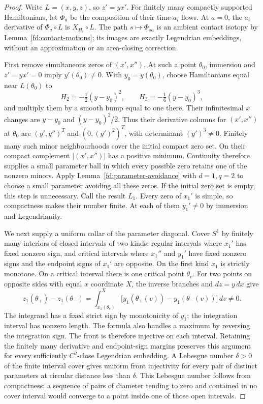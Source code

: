 \begin{proof}
Write $L=(x,y,z)$, so $z'=yx'$. For finitely many compactly supported
Hamiltonians, let $\Phi_a$ be the composition of their time-$a_i$ flows.
At $a=0$, the $a_i$ derivative of $\Phi_a\circ L$ is $X_{H_i}\circ L$.
The path $s\mapsto\Phi_{sa}$ is an ambient contact isotopy by
Lemma~\ref{fd:contact-motions}; its images are exactly Legendrian
embeddings, without an approximation or an area-closing correction.

First remove simultaneous zeros of $(x',x'')$. At such a point
$\theta_0$, immersion and $z'=yx'=0$ imply $y'(\theta_0)\ne0$.
With $y_0=y(\theta_0)$, choose Hamiltonians equal near $L(\theta_0)$ to
\begin{equation}
 H_2=-\tfrac12(y-y_0)^2,\qquad H_3=-\tfrac16(y-y_0)^3,
\end{equation}
and multiply them by a smooth bump equal to one there. Their
infinitesimal $x$ changes are $y-y_0$ and $(y-y_0)^2/2$.
Thus their derivative columns for $(x',x'')$ at $\theta_0$ are
$(y',y'')^T$ and $(0,(y')^2)^T$, with determinant $(y')^3\ne0$.
Finitely many such minor neighbourhoods cover the initial compact zero
set. On their compact complement $|(x',x'')|$ has a positive minimum.
Continuity therefore supplies a small parameter ball in which every
possible zero retains one of the nonzero minors. Apply
Lemma~\ref{fd:parameter-avoidance} with $d=1,q=2$ to choose a small
parameter avoiding all these zeros. If the initial zero set is empty,
this step is unnecessary. Call the result $L_1$.
Every zero of $x_1'$ is simple, so compactness makes their number finite.
At each of them $y_1'\ne0$ by immersion and Legendrianity.

We next supply a uniform collar of the parameter diagonal. Cover $S^1$
by finitely many interiors of closed intervals of two kinds: regular
intervals where $x_1'$ has fixed nonzero sign, and critical intervals
where $x_1''$ and $y_1'$ have fixed nonzero signs and the endpoint signs
of $x_1'$ are opposite. On the first kind $x_1$ is strictly monotone.
On a critical interval there is one critical point $\theta_c$.
For two points on opposite sides with equal $x$ coordinate $X$,
the inverse branches and $dz=y\,dx$ give
\begin{equation}
 z_1(\theta_+)-z_1(\theta_-)
 =\int_{x_1(\theta_c)}^X
     \bigl[y_1(\theta_+(v))-y_1(\theta_-(v))\bigr]\,dv\ne0.
\end{equation}
The integrand has a fixed strict sign by monotonicity of $y_1$;
the integration interval has nonzero length. The formula also handles
a maximum by reversing the integration sign. The front is therefore
injective on each interval. Retaining the finitely many derivative and
endpoint-sign margins preserves this argument for every sufficiently
$C^2$-close Legendrian embedding. A Lebesgue number $\delta>0$ of the
finite interval cover gives uniform front injectivity for every pair
of distinct parameters at circular distance less than $\delta$.
This Lebesgue number follows from compactness: a sequence of pairs of
diameter tending to zero and contained in no cover interval would
converge to a point inside one of those open intervals.


\end{proof}

